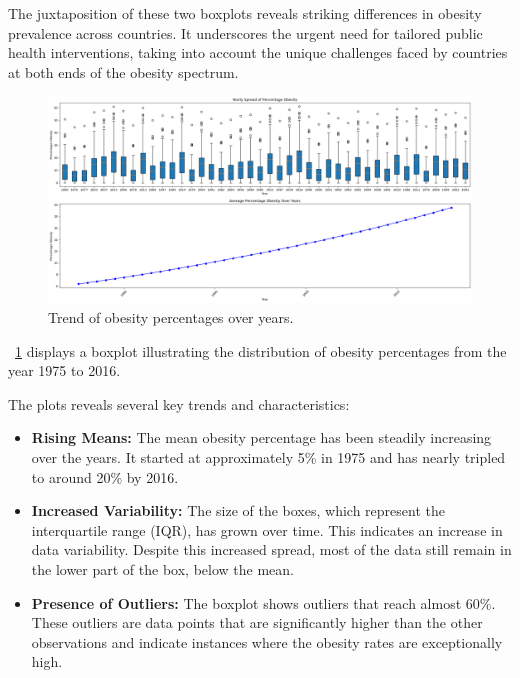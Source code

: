             The juxtaposition of these two boxplots reveals striking differences in obesity prevalence across countries. It underscores the urgent need for tailored public health interventions, taking into account the unique challenges faced by countries at both ends of the obesity spectrum.



            \begin{figure}[H]
                \centering
                \includegraphics[scale=0.3]{images/du_obesity_pe_ob_y_trend}
                \caption{Trend of obesity percentages over years.}
                \label{fig:du-obesity-per-obe-trend-years}
            \end{figure}

            \figurename~\ref{fig:du-obesity-per-obe-trend-years} displays a boxplot illustrating the distribution of obesity percentages from the year 1975 to 2016.

            The plots reveals several key trends and characteristics:

            \begin{itemize}
                \item \textbf{Rising Means:} The mean obesity percentage has been steadily increasing over the years. It started at approximately 5\% in 1975 and has nearly tripled to around 20\% by 2016.

                \item \textbf{Increased Variability:} The size of the boxes, which represent the interquartile range (IQR), has grown over time. This indicates an increase in data variability. Despite this increased spread, most of the data still remain in the lower part of the box, below the mean.

                \item \textbf{Presence of Outliers:} The boxplot shows outliers that reach almost 60\%. These outliers are data points that are significantly higher than the other observations and indicate instances where the obesity rates are exceptionally high.
            \end{itemize}


